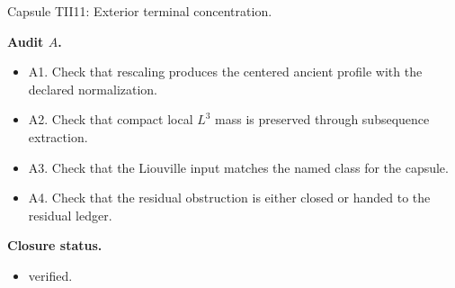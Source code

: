 \documentclass[11pt]{amsart}
\newcommand{\capsulefield}[1]{\par\smallskip\noindent\textbf{#1.}\ }
\begin{document}
\begin{proofcapsule}{Capsule TII11: Exterior terminal concentration.}
  \capsulefield{Audit \(A\)}
  \begin{itemize}[leftmargin=1.8em]
  \item A1. Check that rescaling produces the centered ancient profile with the declared normalization.
  \item A2. Check that compact local $L^3$ mass is preserved through subsequence extraction.
  \item A3. Check that the Liouville input matches the named class for the capsule.
  \item A4. Check that the residual obstruction is either closed or handed to the residual ledger.
  \end{itemize}
  \capsulefield{Closure status}
  \begin{itemize}[leftmargin=1.8em]
  \item verified.
  \end{itemize}
\end{proofcapsule}
\end{document}
